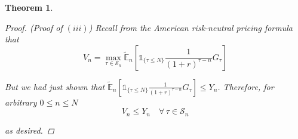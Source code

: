 \documentclass[12pt]{article}
\newtheorem{theorem}{Theorem}
\newcommand{\E}{\mathbb E}
\begin{document}
\begin{theorem}
\begin{proof} {\em (Proof of $(iii)$)}
Recall from the American risk-neutral pricing formula that
\begin{equation*}
	V_n = \max_{\tau \in \mathcal S_n} \tilde{\E}_n \left[ \mathds 1_{\{\tau \leq N\}} \frac{1}{(1 + r)^{\tau - n}} G_\tau  \right]
\end{equation*}

But we had just shown that $\tilde{\E}_n \left[ \mathds 1_{\{\tau \leq N\}} \frac{1}{(1 + r)^{\tau - n}} G_\tau \right] \leq Y_n$. Therefore, for arbitrary $0 \leq n \leq N$
\begin{equation*}
	V_n \leq Y_n \quad \forall\,\tau\in\mathcal S_n
\end{equation*}

as desired.
\end{proof}
\end{theorem}
\end{document}
